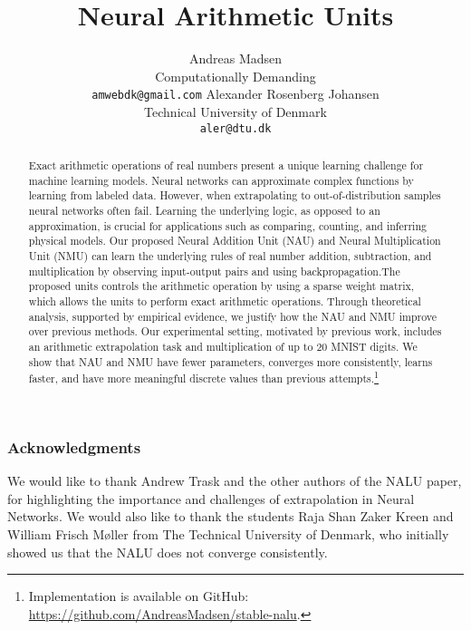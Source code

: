 \documentclass{article}
\title{Neural Arithmetic Units}
\author{%
  Andreas Madsen \\
  Computationally Demanding \\
  \texttt{amwebdk@gmail.com}
  \And
  Alexander Rosenberg Johansen \\
  Technical University of Denmark \\
  \texttt{aler@dtu.dk} \\
}
\def\nonanonymous{}
\begin{document}
\maketitle

\begin{abstract}
Exact arithmetic operations of real numbers present a unique learning challenge for machine learning models. Neural networks can approximate complex functions by learning from labeled data. However, when extrapolating to out-of-distribution samples neural networks often fail. Learning the underlying logic, as opposed to an approximation, is crucial for applications such as comparing, counting, and inferring physical models. Our proposed Neural Addition Unit (NAU) and Neural Multiplication Unit (NMU) can learn the underlying rules of real number addition, subtraction, and multiplication by observing input-output pairs and using backpropagation.The proposed units controls the arithmetic operation by using a sparse weight matrix, which allows the units to perform exact arithmetic operations. Through theoretical analysis, supported by empirical evidence, we justify how the NAU and NMU improve over previous methods. Our experimental setting, motivated by previous work, includes an arithmetic extrapolation task and multiplication of up to 20 MNIST digits. We show that NAU and NMU have fewer parameters, converges more consistently, learns faster, and have more meaningful discrete values than previous attempts.\ifdefined\nonanonymous\footnote{Implementation is available on GitHub: \url{https://github.com/AndreasMadsen/stable-nalu}.}\fi
\end{abstract}







\clearpage
\ifdefined\nonanonymous
\subsubsection*{Acknowledgments}
We would like to thank Andrew Trask and the other authors of the NALU paper, for highlighting the importance and challenges of extrapolation in Neural Networks. We would also like to thank the students Raja Shan Zaker Kreen and William Frisch Møller from The Technical University of Denmark, who initially showed us that the NALU does not converge consistently.
\fi




\newpage
\appendix

\clearpage

\clearpage

\clearpage

\clearpage

\clearpage
\end{document}
